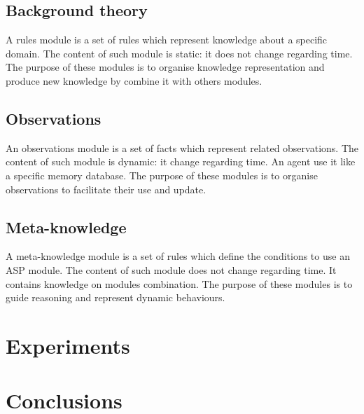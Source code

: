 \documentclass{aamas2012}
\begin{document}
\subsection{Background theory}

	\begin{definition}
		A rules module is a set of rules which represent knowledge about a specific domain.
		The content of such module is static: it does not change regarding time.
		The purpose of these modules is to organise knowledge representation and produce
		new knowledge by combine it with others modules.
	\end{definition}

\subsection{Observations}

	\begin{definition}
		An observations module is a set of facts which represent related observations.
		The content of such module is dynamic: it change regarding time.
		An agent use it like a specific memory database.
		The purpose of these modules is to organise observations to facilitate their use and update.
	\end{definition}

\subsection{Meta-knowledge}

	\begin{definition}
		A meta-knowledge module is a set of rules which define the conditions to use an ASP module.
		The content of such module does not change regarding time.
		It contains knowledge on modules combination.	
		The purpose of these modules is to guide reasoning and represent dynamic behaviours.
	\end{definition}

\section{Experiments}

\section{Conclusions}

	

%

%
%

\nocite{*}
\end{document}
